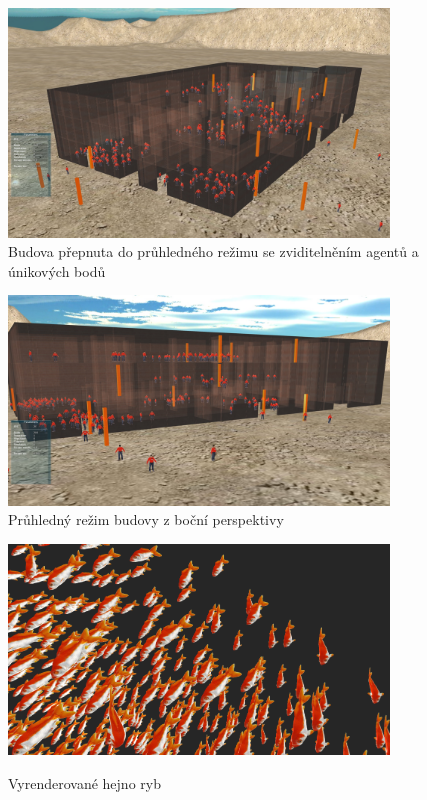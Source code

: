 \documentclass[czech,public,dept460,male,cpdeclaration]{diploma}
\begin{document}
\begin{figure}[H]\centering\includegraphics[width=0.9\textwidth]{Figures/screen6.jpg}
	\caption{Budova přepnuta do průhledného režimu se zviditelněním agentů a únikových bodů}
\end{figure}

\begin{figure}[H]\centering\includegraphics[width=0.9\textwidth]{Figures/screen7.jpg}
	\caption{Průhledný režim budovy z boční perspektivy}
\end{figure}

\begin{figure}[H]\centering\includegraphics[width=0.9\textwidth]{Figures/fish6.jpg}\label{fig:hejnoRyb}
	\caption{Vyrenderované hejno ryb}\label{fig:hejnoRyb}
\end{figure}
\end{document}
